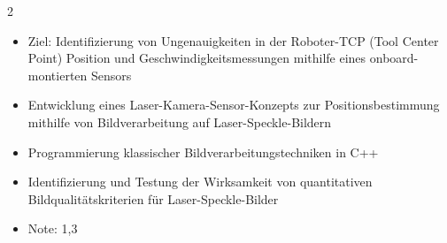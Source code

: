 \documentclass[9pt,a4paper,withhyper]{altacv}
\begin{document}
\begin{paracol}{2}
  \divider

  \begin{itemize}
      \item Ziel: Identifizierung von Ungenauigkeiten in der Roboter-TCP (Tool Center Point) Position und Geschwindigkeitsmessungen mithilfe eines onboard-montierten Sensors
      \item Entwicklung eines Laser-Kamera-Sensor-Konzepts zur Positionsbestimmung mithilfe von Bildverarbeitung auf Laser-Speckle-Bildern
      \item Programmierung klassischer Bildverarbeitungstechniken in C++
      \item Identifizierung und Testung der Wirksamkeit von quantitativen Bildqualitätskriterien für Laser-Speckle-Bilder
      \item Note: 1,3
  \end{itemize}


\end{paracol}
\end{document}
